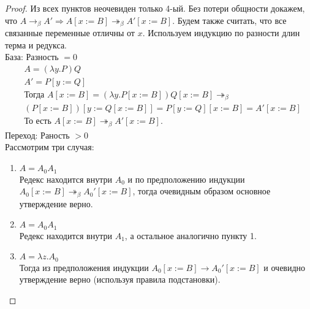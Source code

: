 \begin{proof}
Из всех пунктов неочевиден только 4-ый.
Без потери общности докажем, что $A \to_\beta A' \Rightarrow
A[x:=B] \twoheadrightarrow_\beta A'[x:=B]$.
Будем также считать, что все связанные переменные отличны от $x$.
Используем индукцию по разности длин терма и редукса. \\
База: Разность $= 0$
\begin{align}
& A = (\lambda y . P) Q \\
& A' = P[y:=Q] \\
& \text{Тогда } A[x:=B] = (\lambda y . P[x:=B]) Q[x:=B] \twoheadrightarrow_\beta \\
& (P[x:=B])[y:=Q[x:=B]] = P[y:=Q][x:=B] = A'[x:=B] \\
& \text{То есть } A[x:=B] \twoheadrightarrow_\beta A'[x:=B].
\end{align}
Переход: Раность $> 0$ \\
Рассмотрим три случая:
\begin{enumerate}
\item $A = A_0 A_1$ \\
Редекс находится внутри $A_0$ и по предположению индукции $A_0[x:=B]
\twoheadrightarrow_\beta A_0'[x:=B]$, тогда очевидным образом основное
утверждение верно.
\item $A = A_0 A_1$ \\
Редекс находится внутри $A_1$, а остальное аналогично пункту 1.
\item $A = \lambda z . A_0$ \\
Тогда из предположения индукции $A_0[x:=B] \to A_0'[x:=B]$ и
очевидно утверждение верно (используя правила подстановки).
\end{enumerate}
\end{proof}